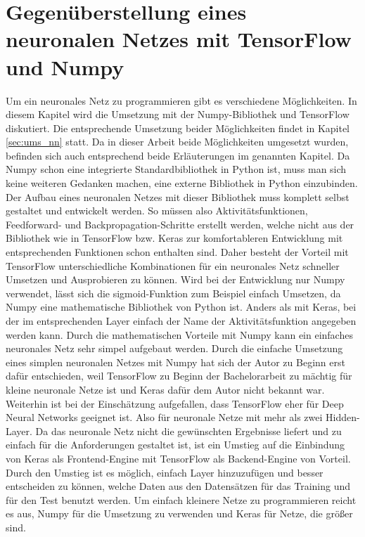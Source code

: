 \section{Gegenüberstellung eines neuronalen Netzes mit TensorFlow und Numpy}
Um ein neuronales Netz zu programmieren gibt es verschiedene Möglichkeiten. In diesem Kapitel wird die Umsetzung mit der Numpy-Bibliothek und TensorFlow diskutiert. Die entsprechende Umsetzung beider Möglichkeiten findet in Kapitel \ref{sec:ums_nn} statt. Da in dieser Arbeit beide Möglichkeiten umgesetzt wurden, befinden sich auch entsprechend beide Erläuterungen im genannten Kapitel.
\newline
\newline
Da Numpy schon eine integrierte Standardbibliothek in Python ist, muss man sich keine weiteren Gedanken machen, eine externe Bibliothek in Python einzubinden. Der Aufbau eines neuronalen Netzes mit dieser Bibliothek muss komplett selbst gestaltet und entwickelt werden. So müssen also Aktivitätsfunktionen, Feedforward- und Backpropagation-Schritte erstellt werden, welche nicht aus der Bibliothek wie in TensorFlow bzw. Keras zur komfortableren Entwicklung mit entsprechenden Funktionen schon enthalten sind. Daher besteht der Vorteil mit TensorFlow unterschiedliche Kombinationen für ein neuronales Netz schneller Umsetzen und Ausprobieren zu können.
\newline
Wird bei der Entwicklung nur Numpy verwendet, lässt sich die sigmoid-Funktion zum Beispiel einfach Umsetzen, da Numpy eine mathematische Bibliothek von Python ist. Anders als mit Keras, bei der im entsprechenden Layer einfach der Name der Aktivitätsfunktion angegeben werden kann. Durch die mathematischen Vorteile mit Numpy kann ein einfaches neuronales Netz sehr simpel aufgebaut werden. Durch die einfache Umsetzung eines simplen neuronalen Netzes mit Numpy hat sich der Autor zu Beginn erst dafür entschieden, weil TensorFlow zu Beginn der Bachelorarbeit zu mächtig für kleine neuronale Netze ist und Keras dafür dem Autor nicht bekannt war. Weiterhin ist bei der Einschätzung aufgefallen, dass TensorFlow eher für Deep Neural Networks geeignet ist. Also für neuronale Netze mit mehr als zwei Hidden-Layer. Da das neuronale Netz nicht die gewünschten Ergebnisse liefert und zu einfach für die Anforderungen gestaltet ist, ist ein Umstieg auf die Einbindung von Keras als Frontend-Engine mit TensorFlow als Backend-Engine von Vorteil. Durch den Umstieg ist es möglich, einfach Layer hinzuzufügen und besser entscheiden zu können, welche Daten aus den Datensätzen für das Training und für den Test benutzt werden. Um einfach kleinere Netze zu programmieren reicht es aus, Numpy für die Umsetzung zu verwenden und Keras für Netze, die größer sind.

